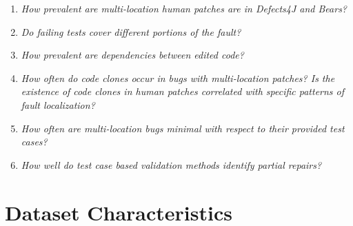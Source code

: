 \documentclass[sigconf, timestamp-false, anonymous=true]{acmart}
\begin{document}
\begin{enumerate}[label=RQ\arabic*:]
\item \emph{How prevalent are multi-location human patches are in Defects4J and Bears?}
\item \emph{Do failing tests cover different portions of the fault?}
\item \emph{How prevalent are dependencies between edited code?}
\item \emph{How often do code clones occur in bugs with multi-location
  patches? Is the existence of code clones in human patches correlated with specific
  patterns of fault localization?}
\item \emph{How often are multi-location bugs minimal with respect to their provided test cases?}
\item \emph{How well do test case based validation methods identify partial repairs?}

\end{enumerate}

\section{Dataset Characteristics}
\label{sec:data-rq1}
\end{document}

